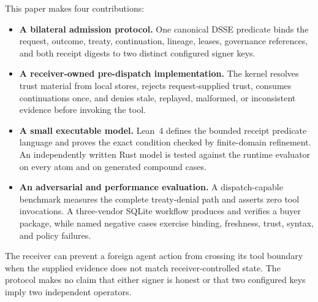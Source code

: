 This paper makes four contributions:

\begin{itemize}[noitemsep,topsep=2pt,leftmargin=1.2em]
  \item \textbf{A bilateral admission protocol.} One canonical DSSE predicate
  binds the request, outcome, treaty, continuation, lineage, leases,
  governance references, and both receipt digests to two distinct configured
  signer keys.
  \item \textbf{A receiver-owned pre-dispatch implementation.} The kernel
  resolves trust material from local stores, rejects request-supplied trust,
  consumes continuations once, and denies stale, replayed, malformed, or
  inconsistent evidence before invoking the tool.
  \item \textbf{A small executable model.} Lean~4 defines the bounded receipt
  predicate language and proves the exact condition checked by finite-domain
  refinement. An independently written Rust model is tested against the
  runtime evaluator on every atom and on generated compound cases.
  \item \textbf{An adversarial and performance evaluation.} A dispatch-capable
  benchmark measures the complete treaty-denial path and asserts zero tool
  invocations. A three-vendor SQLite workflow produces and verifies a buyer
  package, while \PSThreatCaseCount{} named negative cases exercise binding,
  freshness, trust, syntax, and policy failures.
\end{itemize}

The receiver can prevent a foreign agent action from crossing its tool boundary
when the supplied evidence does not match receiver-controlled state. The
protocol makes no claim that either signer is honest or that two configured
keys imply two independent operators.
